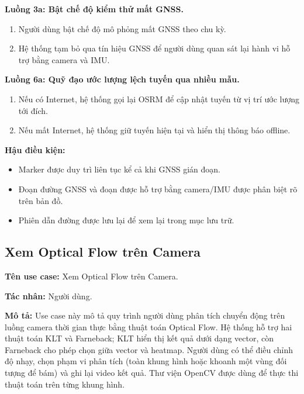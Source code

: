 \documentclass[../DoAn.tex]{subfiles}
\begin{document}
\textbf{Luồng 3a: Bật chế độ kiểm thử mất GNSS.}
\begin{enumerate}[label=3a.\arabic*., leftmargin=2.6em, align=left, labelsep=0.5em]
    \item Người dùng bật chế độ mô phỏng mất GNSS theo chu kỳ.
    \item Hệ thống tạm bỏ qua tín hiệu GNSS để người dùng quan sát lại hành vi hỗ trợ bằng camera và IMU.
\end{enumerate}

\textbf{Luồng 6a: Quỹ đạo ước lượng lệch tuyến qua nhiều mẫu.}
\begin{enumerate}[label=6a.\arabic*., leftmargin=2.6em, align=left, labelsep=0.5em]
    \item Nếu có Internet, hệ thống gọi lại OSRM để cập nhật tuyến từ vị trí ước lượng tới đích.
    \item Nếu mất Internet, hệ thống giữ tuyến hiện tại và hiển thị thông báo offline.
\end{enumerate}

\textbf{Hậu điều kiện:}
\begin{itemize}
    \item Marker được duy trì liên tục kể cả khi GNSS gián đoạn.
    \item Đoạn đường GNSS và đoạn được hỗ trợ bằng camera/IMU được phân biệt rõ trên bản đồ.
    \item Phiên dẫn đường được lưu lại để xem lại trong mục lưu trữ.
\end{itemize}


\subsection{Xem Optical Flow trên Camera}
\label{subsection:2.3.3}
\textbf{Tên use case:} Xem Optical Flow trên Camera.

\textbf{Tác nhân:} Người dùng.

\textbf{Mô tả:} Use case này mô tả quy trình người dùng phân tích chuyển động trên luồng camera thời gian thực bằng thuật toán Optical Flow. Hệ thống hỗ trợ hai thuật toán KLT và Farneback; KLT hiển thị kết quả dưới dạng vector, còn Farneback cho phép chọn giữa vector và heatmap. Người dùng có thể điều chỉnh độ nhạy, chọn phạm vi phân tích (toàn khung hình hoặc khoanh một vùng đối tượng để bám) và ghi lại video kết quả. Thư viện OpenCV được dùng để thực thi thuật toán trên từng khung hình.
\end{document}
